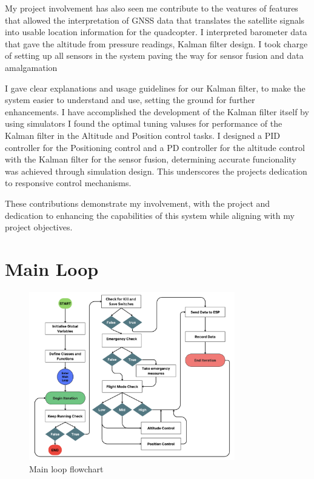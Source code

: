 \documentclass{report}
\begin{document}
My project involvement has also seen me contribute to the veatures of features
that allowed the interpretation of GNSS data that translates the satellite
signals into usable location information for the quadcopter. I interpreted barometer
data that gave the altitude from pressure readings, Kalman filter design. I took
charge of setting up all sensors in the system paving the way for sensor fusion
and data amalgamation

I gave clear explanations and usage guidelines for our Kalman filter, to make
the system easier to understand and use, setting the ground for further
enhancements. I have accomplished the development of the Kalman filter itself by
using simulators I found the optimal tuning valuses for performance of the
Kalman filter in the Altitude and Position control tasks. I designed a PID
controller for the Positioning control and a PD controller for the altitude
control with the Kalman filter for the sensor fusion, determining accurate
funcionality was achieved through simulation design. This underscores the
projects dedication to responsive control mechanisms.

These contributions demonstrate my involvement, with the project and dedication
to enhancing the capabilities of this system while aligning with my project
objectives.

\section{Main Loop}
\begin{figure}[H]
  \centering
  \includegraphics[width=0.8\textwidth]{Pictures/main_loop_flowchart.png}
  \caption{Main loop flowchart}
  \label{fig:main_loop_flowchart}
\end{figure}
\end{document}
